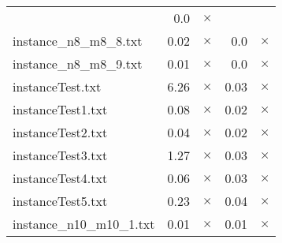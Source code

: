 \documentclass{article}
\begin{document}
\begin{center}
\begin{tabular}{lrrrr}
 & 0.0 & 
$\times$
\\
instance\_n8\_m8\_8.txt & 0.02 & 
$\times$
 & 0.0 & 
$\times$
\\
instance\_n8\_m8\_9.txt & 0.01 & 
$\times$
 & 0.0 & 
$\times$
\\
instanceTest.txt & 6.26 & 
$\times$
 & 0.03 & 
$\times$
\\
instanceTest1.txt & 0.08 & 
$\times$
 & 0.02 & 
$\times$
\\
instanceTest2.txt & 0.04 & 
$\times$
 & 0.02 & 
$\times$
\\
instanceTest3.txt & 1.27 & 
$\times$
 & 0.03 & 
$\times$
\\
instanceTest4.txt & 0.06 & 
$\times$
 & 0.03 & 
$\times$
\\
instanceTest5.txt & 0.23 & 
$\times$
 & 0.04 & 
$\times$
\\
instance\_n10\_m10\_1.txt & 0.01 & 
$\times$
 & 0.01 & 
$\times$
\\
\hline\end{tabular}
\end{center}
\end{document}
